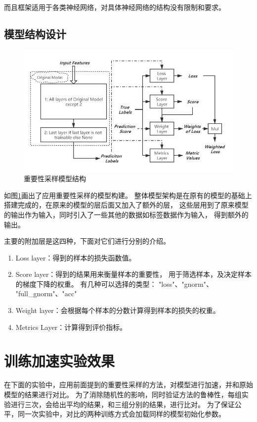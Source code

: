 而且框架适用于各类神经网络，对具体神经网络的结构没有限制和要求。

\subsection{模型结构设计}

\begin{figure}
  \centering
  \includegraphics[width=1.1\linewidth]{figures/重要性采样模型结构.png}
  \caption{重要性采样模型结构}
  \label{fig:importance-sampling-model}
\end{figure}

如图\ref{fig:importance-sampling-model}画出了应用重要性采样的模型构建。
整体模型架构是在原有的模型的基础上搭建完成的，在原来的模型的层后面又加入了额外的层，
这些层用到了原来模型的输出作为输入，同时引入了一些其他的数据如标签数据作为输入，
得到额外的输出。

主要的附加层是这四种，下面对它们进行分别的介绍。
\begin{enumerate}
  \item Loss layer：得到的样本的损失函数值。
  \item Score layer：得到的结果用来衡量样本的重要性，
  用于筛选样本，及决定样本的梯度下降的权重。
  有几种可以选择的类型：
  "loss"、"gnorm"、
  "full\_gnorm"、"acc"
  \item Weight layer：会根据每个样本的分数计算得到样本的损失的权重。
  \item Metrics Layer：计算得到评价指标。
\end{enumerate}

\section{训练加速实验效果}

  在下面的实验中，应用前面提到的重要性采样的方法，对模型进行加速，并和原始模型的结果进行对比。
  为了消除随机性的影响，同时验证方法的鲁棒性，每组实验进行三次，会给出平均的结果，和三组分别的结果，进行比对。
  为了保证公平，同一次实验中，对比的两种训练方式会加载同样的模型初始化参数。

